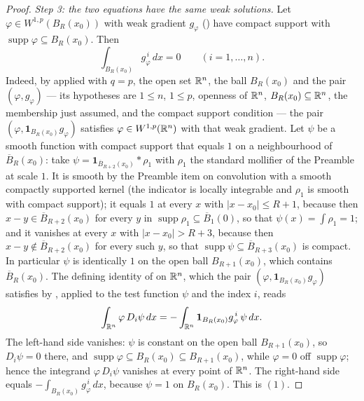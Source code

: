 \begin{proof}
\emph{Step 3: the two equations have the same weak solutions.}  Let
$\varphi\in W^{1,p}(B_R(x_0))$ with weak gradient $g_\varphi$
() have compact support with
$\operatorname{supp}\varphi\subseteq B_R(x_0)$.  Then
\[
\int_{B_R(x_0)}g_\varphi^{\,i}\,dx=0\qquad(i=1,\dots,n).
\tag{1}
\]
Indeed, by  applied with $q=p$, the open set
$\mathbb{R}^n$, the ball $B_R(x_0)$ and the pair $(\varphi,g_\varphi)$ --- its
hypotheses are $1\le n$, $1\le p$, openness of $\mathbb{R}^n$,
$B_R(x_0)\subseteq\mathbb{R}^n$, the membership just assumed, and the compact support
condition --- the pair $(\varphi,\mathbf1_{B_R(x_0)}g_\varphi)$ satisfies
$\varphi\in W^{1,p}(\mathbb{R}^n)$ with that weak gradient.  Let $\psi$ be a smooth
function with compact support that equals $1$ on a neighbourhood of
$\overline B_R(x_0)$: take $\psi=\mathbf1_{\overline B_{R+2}(x_0)}*\rho_1$ with
$\rho_1$ the standard mollifier of the Preamble at scale $1$.  It is smooth by
the Preamble item on convolution with a smooth compactly supported kernel (the
indicator is locally integrable and $\rho_1$ is smooth with compact support);
it equals $1$ at every $x$ with $|x-x_0|\le R+1$, because then
$x-y\in\overline B_{R+2}(x_0)$ for every $y$ in
$\operatorname{supp}\rho_1\subseteq\overline B_1(0)$, so that
$\psi(x)=\int\rho_1=1$; and it vanishes at every $x$ with $|x-x_0|>R+3$,
because then $x-y\notin\overline B_{R+2}(x_0)$ for every such $y$, so that
$\operatorname{supp}\psi\subseteq\overline B_{R+3}(x_0)$ is compact.  In
particular $\psi$ is identically $1$ on the open ball $B_{R+1}(x_0)$, which
contains $\overline B_R(x_0)$.  The defining identity of
 on $\mathbb{R}^n$, which the pair
$(\varphi,\mathbf1_{B_R(x_0)}g_\varphi)$ satisfies by ,
applied to the test function $\psi$ and the index $i$, reads
\[
\int_{\mathbb{R}^n}\varphi\,D_i\psi\,dx
=-\int_{\mathbb{R}^n}\mathbf1_{B_R(x_0)}g_\varphi^{\,i}\,\psi\,dx .
\]
The left-hand side vanishes: $\psi$ is constant on the open ball
$B_{R+1}(x_0)$, so $D_i\psi=0$ there, and
$\operatorname{supp}\varphi\subseteq B_R(x_0)\subseteq B_{R+1}(x_0)$, while
$\varphi=0$ off $\operatorname{supp}\varphi$; hence the integrand
$\varphi\,D_i\psi$ vanishes at every point of $\mathbb{R}^n$.  The right-hand side
equals $-\int_{B_R(x_0)}g_\varphi^{\,i}\,dx$, because $\psi=1$ on $B_R(x_0)$.
This is $(1)$.


\end{proof}
